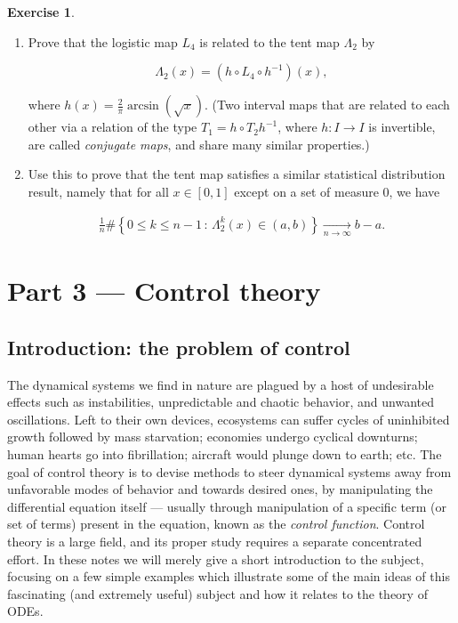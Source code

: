 \documentclass[11pt]{report}
\theoremstyle{plain}
\theoremstyle{definition}
\newtheorem{xexercise}[thm]{Exercise}
\begin{document}
\begin{xexercise}

\begin{enumerate}[label=\arabic*.]
\item Prove that the logistic map $L_4$ is related to the
tent map $\Lambda_2$ by

\[
\Lambda_2(x) = (h\circ L_4 \circ h^{-1})(x),
\]

where $h(x) = \frac{2}{\pi}\arcsin(\sqrt{x})$. (Two
interval maps that are related to each other via a
relation of the type $T_1=h\circ T_2 h^{-1}$, where
$h:I\to I$ is invertible, are called \emph{conjugate
maps}, and share many similar properties.)

\item Use this to prove that the tent map satisfies a
similar statistical distribution result, namely that
for all $x\in[0,1]$ except on a set of measure 0, we
have

\begin{align*}
\frac{1}{n}\#\left\{ 0\le k\le n-1\,:\, \Lambda_2^k(x) \in (a,b) \right\} \xrightarrow[n\to\infty]{} b-a.
\end{align*}
\end{enumerate}

\end{xexercise}

\chapter{Part 3 — Control theory}

\section{Introduction: the problem of control}
The dynamical systems we find in nature are plagued
by a host of undesirable effects such as
instabilities, unpredictable and chaotic behavior, and
unwanted oscillations. Left to their own devices,
ecosystems can suffer cycles of uninhibited growth
followed by mass starvation; economies undergo
cyclical downturns; human hearts go into fibrillation;
aircraft would plunge down to earth; etc. The goal of
control theory is to devise methods to steer dynamical
systems away from unfavorable modes of behavior and
towards desired ones, by manipulating the differential
equation itself --- usually through manipulation of a
specific term (or set of terms) present in the
equation, known as the \emph{control function}. Control
theory is a large field, and its proper study requires
a separate concentrated effort. In these notes we will
merely give a short introduction to the subject,
focusing on a few simple examples which illustrate
some of the main ideas of this fascinating (and
extremely useful) subject and how it relates to the
theory of ODEs.
\end{document}

